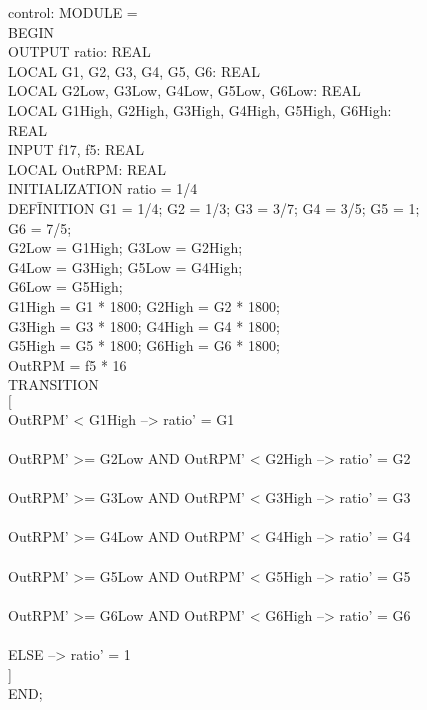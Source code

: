\documentclass{llncs}
\begin{document}
\begin{figure}
\begin{tt}
\begin{tabbing}
control: MODULE =
\\
BEGIN
\\
OUTPUT ratio: REAL
\\
LOCAL G1, G2, G3, G4, G5, G6: REAL
\\
LOCAL G2Low, G3Low, G4Low, G5Low, G6Low: REAL
\\
LOCAL G1High, G2High, G3High, G4High, G5High, G6High: REAL
\\
INPUT f17, f5: REAL
\\
LOCAL OutRPM: REAL
\\
INITIALIZATION ratio = 1/4
\\
DEF\=INITION G1 = 1/4; G2 = 1/3; G3 = 3/7; G4 = 3/5; G5 = 1; G6 = 7/5;
\\ \>
 G2Low = G1High; 
 G3Low = G2High; 
\\ \>
 G4Low = G3High; 
 G5Low = G4High; 
\\ \>
 G6Low = G5High; 
\\ \>
 G1High = G1 * 1800;
 G2High = G2 * 1800;
\\ \>
 G3High = G3 * 1800;
 G4High = G4 * 1800;
\\ \>
 G5High = G5 * 1800;
 G6High = G6 * 1800;
\\ \>
 OutRPM = f5 * 16
\\
TRA\=NSITION
\\
$[$
\\  \>
 OutRPM' < G1High --> ratio' = G1
\\ \>
 []
\\ \>
 OutRPM' >= G2Low AND OutRPM' < G2High --> ratio' = G2
\\ \>
 []
\\ \>
 OutRPM' >= G3Low AND OutRPM' < G3High --> ratio' = G3
\\ \>
 []
\\ \>
 OutRPM' >= G4Low AND OutRPM' < G4High --> ratio' = G4
\\ \>
 []
\\ \>
 OutRPM' >= G5Low AND OutRPM' < G5High --> ratio' = G5
\\ \>
 []
\\ \>
 OutRPM' >= G6Low AND OutRPM' < G6High --> ratio' = G6
\\ \>
 []
\\ \>
 ELSE --> ratio' = 1
\\
]
\\
END;
\\


\end{tabbing}
\end{tt}
\end{figure}
\end{document}
